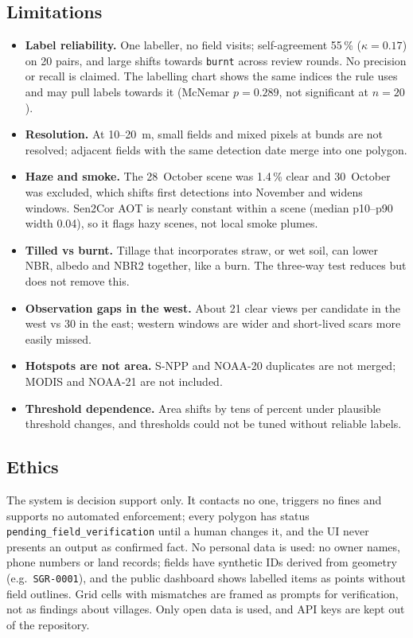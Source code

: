 \documentclass[conference]{IEEEtran}
\begin{document}
\subsection{Limitations}
\begin{itemize}
\item \textbf{Label reliability.} One labeller, no field visits; self-agreement 55\,\%
($\kappa=0.17$) on 20 pairs, and large shifts towards \texttt{burnt} across review rounds. No
precision or recall is claimed. The labelling chart shows the same indices the rule uses and may
pull labels towards it (McNemar $p=0.289$, not significant at $n=20$).
\item \textbf{Resolution.} At 10--20~m, small fields and mixed pixels at bunds are not resolved;
adjacent fields with the same detection date merge into one polygon.
\item \textbf{Haze and smoke.} The 28~October scene was 1.4\,\% clear and 30~October was excluded,
which shifts first detections into November and widens windows. Sen2Cor AOT is nearly constant
within a scene (median p10--p90 width 0.04), so it flags hazy scenes, not local smoke plumes.
\item \textbf{Tilled vs burnt.} Tillage that incorporates straw, or wet soil, can lower NBR,
albedo and NBR2 together, like a burn. The three-way test reduces but does not remove this.
\item \textbf{Observation gaps in the west.} About 21 clear views per candidate in the west vs 30
in the east; western windows are wider and short-lived scars more easily missed.
\item \textbf{Hotspots are not area.} S-NPP and NOAA-20 duplicates are not merged; MODIS and
NOAA-21 are not included.
\item \textbf{Threshold dependence.} Area shifts by tens of percent under plausible threshold
changes, and thresholds could not be tuned without reliable labels.
\end{itemize}

\subsection{Ethics}
The system is decision support only. It contacts no one, triggers no fines and supports no
automated enforcement; every polygon has status \texttt{pending\_field\_verification} until a human
changes it, and the UI never presents an output as confirmed fact. No personal data is used: no
owner names, phone numbers or land records; fields have synthetic IDs derived from geometry (e.g.\
\texttt{SGR-0001}), and the public dashboard shows labelled items as points without field outlines.
Grid cells with mismatches are framed as prompts for verification, not as findings about
villages. Only open data is used, and API keys are kept out of the repository.
\end{document}
